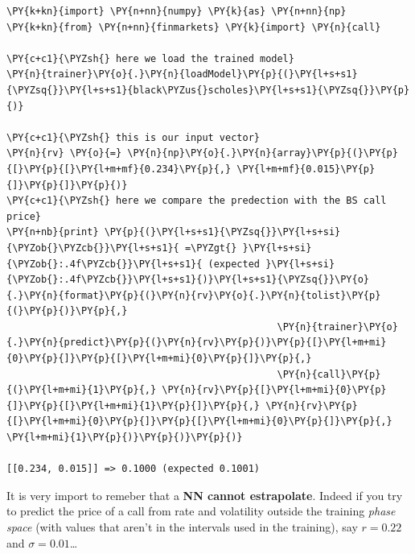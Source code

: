 \begin{tcolorbox}[breakable, size=fbox, boxrule=1pt, pad at break*=1mm,colback=cellbackground, colframe=cellborder]
\begin{Verbatim}[commandchars=\\\{\}]
\PY{k+kn}{import} \PY{n+nn}{numpy} \PY{k}{as} \PY{n+nn}{np}
\PY{k+kn}{from} \PY{n+nn}{finmarkets} \PY{k}{import} \PY{n}{call}
	
\PY{c+c1}{\PYZsh{} here we load the trained model}
\PY{n}{trainer}\PY{o}{.}\PY{n}{loadModel}\PY{p}{(}\PY{l+s+s1}{\PYZsq{}}\PY{l+s+s1}{black\PYZus{}scholes}\PY{l+s+s1}{\PYZsq{}}\PY{p}{)}
	
\PY{c+c1}{\PYZsh{} this is our input vector}
\PY{n}{rv} \PY{o}{=} \PY{n}{np}\PY{o}{.}\PY{n}{array}\PY{p}{(}\PY{p}{[}\PY{p}{[}\PY{l+m+mf}{0.234}\PY{p}{,} \PY{l+m+mf}{0.015}\PY{p}{]}\PY{p}{]}\PY{p}{)}
\PY{c+c1}{\PYZsh{} here we compare the predection with the BS call price}
\PY{n+nb}{print} \PY{p}{(}\PY{l+s+s1}{\PYZsq{}}\PY{l+s+si}{\PYZob{}\PYZcb{}}\PY{l+s+s1}{ =\PYZgt{} }\PY{l+s+si}{\PYZob{}:.4f\PYZcb{}}\PY{l+s+s1}{ (expected }\PY{l+s+si}{\PYZob{}:.4f\PYZcb{}}\PY{l+s+s1}{)}\PY{l+s+s1}{\PYZsq{}}\PY{o}{.}\PY{n}{format}\PY{p}{(}\PY{n}{rv}\PY{o}{.}\PY{n}{tolist}\PY{p}{(}\PY{p}{)}\PY{p}{,} 
                                               \PY{n}{trainer}\PY{o}{.}\PY{n}{predict}\PY{p}{(}\PY{n}{rv}\PY{p}{)}\PY{p}{[}\PY{l+m+mi}{0}\PY{p}{]}\PY{p}{[}\PY{l+m+mi}{0}\PY{p}{]}\PY{p}{,} 
                                               \PY{n}{call}\PY{p}{(}\PY{l+m+mi}{1}\PY{p}{,} \PY{n}{rv}\PY{p}{[}\PY{l+m+mi}{0}\PY{p}{]}\PY{p}{[}\PY{l+m+mi}{1}\PY{p}{]}\PY{p}{,} \PY{n}{rv}\PY{p}{[}\PY{l+m+mi}{0}\PY{p}{]}\PY{p}{[}\PY{l+m+mi}{0}\PY{p}{]}\PY{p}{,} \PY{l+m+mi}{1}\PY{p}{)}\PY{p}{)}\PY{p}{)}

[[0.234, 0.015]] => 0.1000 (expected 0.1001)
\end{Verbatim}
\end{tcolorbox}

It is very import to remeber that a \textbf{NN cannot estrapolate}.
Indeed if you try to predict the price of a call from rate and
volatility outside the training \emph{phase space} (with values that
aren't in the intervals used in the training), say \(r = 0.22\) and
\(\sigma = 0.01\)\ldots{}

